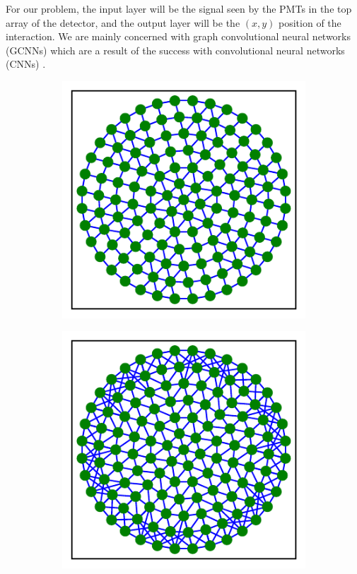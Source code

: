 \documentclass[../thesis.tex]{subfiles}
\begin{document}
\par For our problem, the input layer will be the signal seen by the PMTs in the top array of the detector, and the output layer will be the $(x,y)$ position of the interaction.
We are mainly concerned with graph convolutional neural networks (GCNNs) which are a result of the success with convolutional neural networks (CNNs) \cite{GCNN_Kipf}.
\begin{figure}[t]
	\centering
	\begin{subfigure}{0.32\textwidth}
		\includegraphics[width=\textwidth]{figures/1T_radius-graph_R10.pdf}
		\caption{}
	\end{subfigure}
	\begin{subfigure}{0.32\textwidth}
		\includegraphics[width=\textwidth]{figures/1T_kNN-graph_k6.pdf}

\end{subfigure}
\end{figure}
\end{document}
